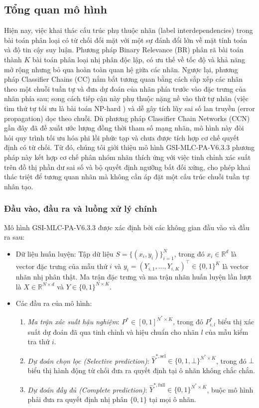 \documentclass[11pt,a4paper]{article}
\begin{document}
\subsection{Tổng quan mô hình}
Hiện nay, việc khai thác cấu trúc phụ thuộc nhãn (label interdependencies) trong bài toán phân loại có từ chối đối mặt với một sự đánh đổi lớn về mặt tính toán và độ tin cậy suy luận. Phương pháp Binary Relevance (BR) \cite{br2018} phân rã bài toán thành $K$ bài toán phân loại nhị phân độc lập, có ưu thế về tốc độ và khả năng mở rộng nhưng bỏ qua hoàn toàn quan hệ giữa các nhãn. Ngược lại, phương pháp Classifier Chains (CC) \cite{cc2011,cc2021} nắm bắt tương quan bằng cách sắp xếp các nhãn theo một chuỗi tuần tự và đưa dự đoán của nhãn phía trước vào đặc trưng của nhãn phía sau; song cách tiếp cận này phụ thuộc nặng nề vào thứ tự nhãn (việc tìm thứ tự tối ưu là bài toán NP-hard \cite{cc2021}) và dễ gây tích lũy sai số lan truyền (error propagation) dọc theo chuỗi. Dù phương pháp Classifier Chain Networks (CCN) gần đây \cite{ccn2025} đã đề xuất ước lượng đồng thời tham số mạng nhãn, mô hình này đòi hỏi quy trình tối ưu hóa phi lồi phức tạp và chưa được tích hợp cơ chế quyết định có từ chối. Từ đó, chúng tôi giới thiệu mô hình GSI-MLC-PA-V6.3.3 phương pháp này kết hợp cơ chế phân nhóm nhãn thích ứng với việc tinh chỉnh xác suất trên đồ thị phần dư sai số và bộ quyết định ngưỡng bất đối xứng, cho phép khai thác triệt để tương quan nhãn mà không cần áp đặt một cấu trúc chuỗi tuần tự nhân tạo.

\subsubsection{Đầu vào, đầu ra và luồng xử lý chính}
Mô hình GSI-MLC-PA-V6.3.3 được xác định bởi các không gian đầu vào và đầu ra sau:
\begin{itemize}
  \item Dữ liệu huấn luyện: Tập dữ liệu $S = \{(x_i, y_i)\}_{i=1}^N$, trong đó $x_i \in \mathbb{R}^d$ là vector đặc trưng của mẫu thứ $i$ và $y_i = (Y_{i,1}, \ldots, Y_{i,K})^\top \in \{0, 1\}^K$ là vector nhãn nhị phân thật. Ma trận đặc trưng và ma trận nhãn huấn luyện lần lượt là $X \in \mathbb{R}^{N \times d}$ và $Y \in \{0, 1\}^{N \times K}$.
  \item Các đầu ra của mô hình:
    \begin{enumerate}
      \item \emph{Ma trận xác suất hậu nghiệm}: $P^* \in [0, 1]^{N^* \times K}$, trong đó $P^*_{i,l}$ biểu thị xác suất dự đoán đã qua tinh chỉnh và hiệu chuẩn cho nhãn $l$ của mẫu kiểm tra thứ $i$.
      \item \emph{Dự đoán chọn lọc (Selective prediction)}: $\hat Y^{*,\mathrm{sel}} \in \{0, 1, \bot\}^{N^* \times K}$, trong đó $\bot$ biểu thị hành động từ chối đưa ra quyết định tại ô nhãn không chắc chắn.
      \item \emph{Dự đoán đầy đủ (Complete prediction)}: $\hat Y^{*,\mathrm{full}} \in \{0, 1\}^{N^* \times K}$, buộc mô hình phải đưa ra quyết định nhị phân $\{0, 1\}$ tại mọi ô nhãn.
    \end{enumerate}
\end{itemize}
\end{document}
